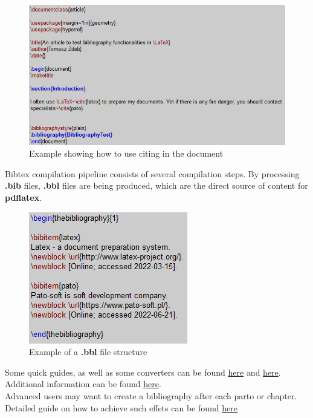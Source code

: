 \begin{figure}[H]
\centering
\includegraphics[scale=0.9]{content/LaTeX/figures/biblio_latex.png}
\caption{Example showing how to use citing in the document}
\label{fig:biblio_usage}
\end{figure}

Bibtex compilation pipeline consists of several compilation steps. By processing \textbf{.bib} files, \textbf{.bbl} files are being produced, which are the direct source of content for \textbf{pdflatex}.

\begin{figure}[H]
\centering
\includegraphics[scale=0.9]{content/LaTeX/figures/biblio_bbl.png}
\caption{Example of a \textbf{.bbl} file structure}
\label{fig:biblio_bbl_example}
\end{figure}

Some quick guides, as well as some converters can be found \href{https://www.bibtex.com/g/bibtex-format/}{here} and \href{https://www.overleaf.com/learn/latex/Bibliography_management_with_bibtex}{here}. Additional information can be found \href{https://tug.org/bibtex/}{here}.\\

Advanced users may want to create a bibliography after each parto or chapter. Detailed guide on how to achieve such effets can be found \href{https://tex.stackexchange.com/questions/229846/different-bibliographies-for-each-chapter-with-shared-references}{here}

